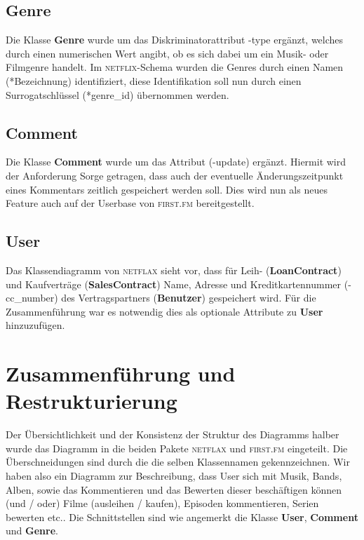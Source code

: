 \documentclass[11pt,a4paper,DIV=9]{scrartcl}
\begin{document}
  \subsection{Genre} 
    Die Klasse \textbf{Genre} wurde um das Diskriminatorattribut -type ergänzt, welches durch einen numerischen Wert angibt, ob es sich dabei um ein Musik- oder Filmgenre handelt. Im \textsc{netflix}-Schema wurden die Genres durch einen Namen (*Bezeichnung) identifiziert, diese Identifikation soll nun durch einen Surrogatschlüssel  (*genre\_id) \"ubernommen werden.
  \subsection{Comment}
    Die Klasse \textbf{Comment} wurde um das Attribut (-update) ergänzt. Hiermit wird der Anforderung Sorge getragen, dass auch der eventuelle Änderungszeitpunkt eines Kommentars zeitlich gespeichert werden soll. Dies wird nun als neues Feature auch auf der Userbase von \textsc{first.fm} bereitgestellt.    
  \subsection{User}
    Das Klassendiagramm von \textsc{netflax} sieht vor, dass für Leih- (\textbf{LoanContract}) und Kaufverträge (\textbf{SalesContract}) Name, Adresse und Kreditkartennummer (-cc\_number) des Vertragspartners (\textbf{Benutzer}) gespeichert wird. Für die Zusammenführung war es notwendig dies als optionale Attribute zu \textbf{User} hinzuzufügen.
\section{Zusammenführung und Restrukturierung}
  Der Übersichtlichkeit und der Konsistenz der Struktur des Diagramms halber wurde das Diagramm in die beiden Pakete \textsc{netflax} und \textsc{first.fm} eingeteilt. Die Überschneidungen sind durch die die selben Klassennamen gekennzeichnen.
  Wir haben also ein Diagramm zur Beschreibung, dass User sich mit Musik, Bands, Alben, sowie das Kommentieren und das Bewerten dieser besch\"aftigen k\"onnen (und / oder) Filme (ausleihen / kaufen), Episoden kommentieren, Serien bewerten etc.. Die Schnittstellen sind wie angemerkt die Klasse \textbf{User}, \textbf{Comment} und \textbf{Genre}.
\end{document}
